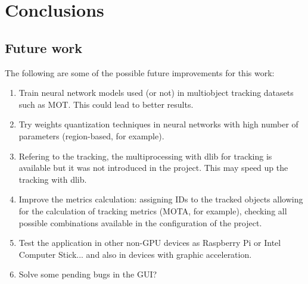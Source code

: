 \chapter{Conclusions}
\section{Future work}
The following are some of the possible future improvements for this work:
\begin{enumerate}
    \item Train neural network models used (or not) in multiobject tracking datasets such as MOT. This could lead to better results.
    \item Try weights quantization techniques in neural networks with high number of parameters (region-based, for example).
    \item Refering to the tracking, the multiprocessing with dlib for tracking is available but it was not introduced in the project. This may speed up the tracking with dlib.
    \item Improve the metrics calculation: assigning IDs to the tracked objects allowing for the calculation of tracking metrics (MOTA, for example), checking all possible combinations available in the configuration of the project.
    \item Test the application in other non-GPU devices as Raspberry Pi or Intel Computer Stick... and also in devices with graphic acceleration.
    \item Solve some pending bugs in the GUI?
\end{enumerate}